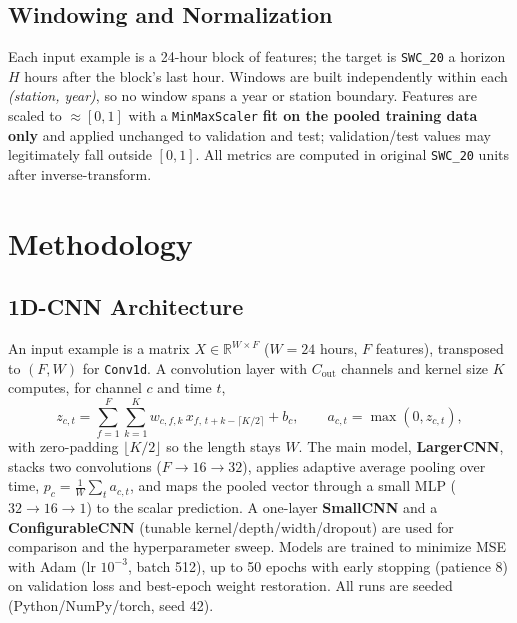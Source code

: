 \documentclass[11pt]{article}
\begin{document}
\subsection{Windowing and Normalization}

Each input example is a 24-hour block of features; the target is \texttt{SWC\_20}
a horizon $H$ hours after the block's last hour. Windows are built independently
within each \emph{(station, year)}, so no window spans a year or station
boundary. Features are scaled to $\approx[0,1]$ with a \texttt{MinMaxScaler}
\textbf{fit on the pooled training data only} and applied unchanged to validation
and test; validation/test values may legitimately fall outside $[0,1]$. All
metrics are computed in original \texttt{SWC\_20} units after inverse-transform.

\section{Methodology}

\subsection{1D-CNN Architecture}

An input example is a matrix $X\in\mathbb{R}^{W\times F}$ ($W=24$ hours, $F$
features), transposed to $(F, W)$ for \texttt{Conv1d}. A convolution layer with
$C_{\text{out}}$ channels and kernel size $K$ computes, for channel $c$ and time
$t$,
\begin{equation}
z_{c,t} = \sum_{f=1}^{F}\sum_{k=1}^{K} w_{c,f,k}\,
x_{f,\,t+k-\lceil K/2\rceil} + b_c,
\qquad a_{c,t} = \max(0, z_{c,t}),
\end{equation}
with zero-padding $\lfloor K/2\rfloor$ so the length stays $W$. The main model,
\textbf{LargerCNN}, stacks two convolutions ($F\!\to\!16\!\to\!32$), applies
adaptive average pooling over time,
$p_c = \frac{1}{W}\sum_t a_{c,t}$, and maps the pooled vector through a small MLP
($32\!\to\!16\!\to\!1$) to the scalar prediction. A one-layer \textbf{SmallCNN}
and a \textbf{ConfigurableCNN} (tunable kernel/depth/width/dropout) are used for
comparison and the hyperparameter sweep. Models are trained to minimize MSE with
Adam \cite{kingma2015adam} (lr $10^{-3}$, batch 512), up to 50 epochs with early
stopping (patience 8) on validation loss and best-epoch weight restoration. All
runs are seeded (Python/NumPy/torch, seed 42).
\end{document}
